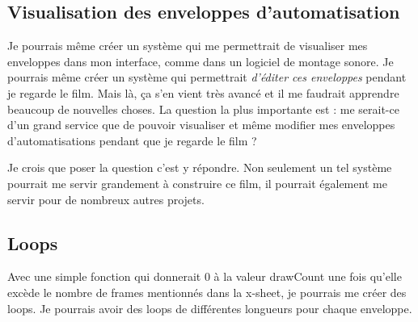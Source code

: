 \subsection{Visualisation des enveloppes d'automatisation}
Je pourrais même créer un système qui me permettrait de visualiser mes enveloppes dans mon interface, comme dans un logiciel de montage sonore. Je pourrais même créer un système qui permettrait \textit{d'éditer ces enveloppes} pendant je regarde le film. Mais là, ça s'en vient très avancé et il me faudrait apprendre beaucoup de nouvelles choses. La question la plus importante est : me serait-ce d'un grand service que de pouvoir visualiser et même modifier mes enveloppes d'automatisations pendant que je regarde le film ?

Je crois que poser la question c'est y répondre. Non seulement un tel système pourrait me servir grandement à construire ce film, il pourrait également me servir pour de nombreux autres projets.

\subsection{Loops}
Avec une simple fonction qui donnerait 0 à la valeur drawCount une fois qu'elle excède le nombre de frames mentionnés dans la x-sheet, je pourrais me créer des loops. Je pourrais avoir des loops de différentes longueurs pour chaque enveloppe.
